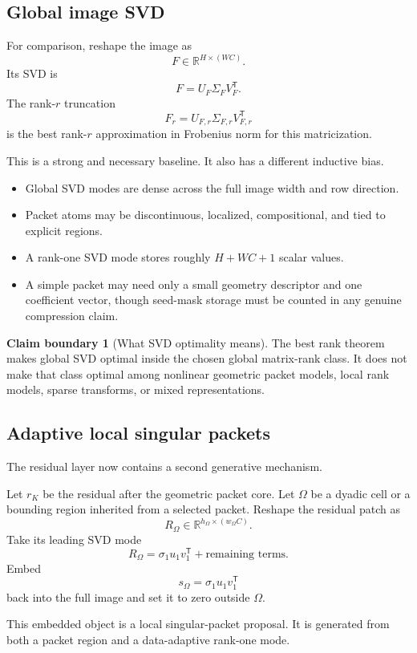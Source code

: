 \documentclass[11pt]{article}
\theoremstyle{definition}
\newtheorem{boundary}[theorem]{Claim boundary}
\theoremstyle{remark}
\newcommand{\R}{\mathbb R}
\begin{document}
\FloatBarrier
\subsection{Global image SVD}
For comparison, reshape the image as
\[
F\in\R^{H\times(WC)}.
\]
Its SVD is
\[
F=U_F\Sigma_FV_F^{\mathsf T}.
\]
The rank-$r$ truncation
\[
F_r=U_{F,r}\Sigma_{F,r}V_{F,r}^{\mathsf T}
\]
is the best rank-$r$ approximation in Frobenius norm for this matricization.

This is a strong and necessary baseline. It also has a different inductive bias.

\begin{itemize}
\item Global SVD modes are dense across the full image width and row direction.
\item Packet atoms may be discontinuous, localized, compositional, and tied to explicit regions.
\item A rank-one SVD mode stores roughly $H+WC+1$ scalar values.
\item A simple packet may need only a small geometry descriptor and one coefficient vector, though seed-mask storage must be counted in any genuine compression claim.
\end{itemize}

\begin{boundary}[What SVD optimality means]
The best rank theorem makes global SVD optimal inside the chosen global matrix-rank class. It does not make that class optimal among nonlinear geometric packet models, local rank models, sparse transforms, or mixed representations.
\end{boundary}

\FloatBarrier
\subsection{Adaptive local singular packets}
The residual layer now contains a second generative mechanism.

Let $r_K$ be the residual after the geometric packet core. Let $\Omega$ be a dyadic cell or a bounding region inherited from a selected packet. Reshape the residual patch as
\[
R_\Omega\in\R^{h_\Omega\times(w_\Omega C)}.
\]
Take its leading SVD mode
\[
R_\Omega
=\sigma_1u_1v_1^{\mathsf T}+\text{remaining terms}.
\]
Embed
\[
s_\Omega=\sigma_1u_1v_1^{\mathsf T}
\]
back into the full image and set it to zero outside $\Omega$.

This embedded object is a local singular-packet proposal. It is generated from both a packet region and a data-adaptive rank-one mode.
\end{document}
